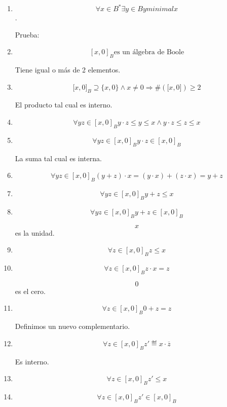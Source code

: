 \begin{enumerate}
\begin{enumerate}
\begin{enumerate}
      \begin{enumerate}
      \def\labelenumiv{\arabic{enumiv}.}
      \item
        \[\forall{x \in B^{\ast}}\exists{y \in B}y\mathsf{\mathit{minimal}}x\].

        Prueba:
      \item
        \[\left\lbrack {x,0} \right\rbrack_{B}\text{es un álgebra de Boole}\]

        Tiene igual o más de 2 elementos.
      \item
        \[{{{\lbrack{x,0}\rbrack}_{B} \supseteq {{\{{x,0}\}} \land x}} \neq 0}\Rightarrow\#{{({\lbrack{x,0}\rbrack})} \geq 2}\]

        El producto tal cual es interno.
      \item
        \[\forall{\mathit{yz} \in \left\lbrack {x,0} \right\rbrack_{B}}{{{{{y \cdot z} \leq y} \leq {{x \land y} \cdot z}} \leq z} \leq x}\]
      \item
        \[\forall{\mathit{yz} \in \left\lbrack {x,0} \right\rbrack_{B}}{{y \cdot z} \in \left\lbrack {x,0} \right\rbrack_{B}}\]

        La suma tal cual es interna.
      \item
        \[\forall{\mathit{yz} \in \left\lbrack {x,0} \right\rbrack_{B}}{{{{({y + z})} \cdot x} = {{({y \cdot x})} + {({z \cdot x})}}} = {y + z}}\]
      \item
        \[\forall{\mathit{yz} \in \left\lbrack {x,0} \right\rbrack_{B}}{{y + z} \leq x}\]
      \item
        \[\forall{\mathit{yz} \in \left\lbrack {x,0} \right\rbrack_{B}}{{y + z} \in \left\lbrack {x,0} \right\rbrack_{B}}\]

        \[x\]es la unidad.
      \item
        \[\forall{z \in \left\lbrack {x,0} \right\rbrack_{B}}{z \leq x}\]
      \item
        \[\forall{z \in \left\lbrack {x,0} \right\rbrack_{B}}{{z \cdot x} = z}\]

        \[0\] es el cero.
      \item
        \[\forall{z \in \left\lbrack {x,0} \right\rbrack_{B}}{{0 + z} = z}\]

        Definimos un nuevo complementario.
      \item
        \[\forall{z \in \left\lbrack {x,0} \right\rbrack_{B}}{{z'} ≝ {x \cdot \overline{z}}}\]

        Es interno.
      \item
        \[\forall{z \in \left\lbrack {x,0} \right\rbrack_{B}}{{z'} \leq x}\]
      \item
        \[\forall{z \in \left\lbrack {x,0} \right\rbrack_{B}}{{z'} \in \left\lbrack {x,0} \right\rbrack_{B}}\]


\end{enumerate}
\end{enumerate}
\end{enumerate}
\end{enumerate}
